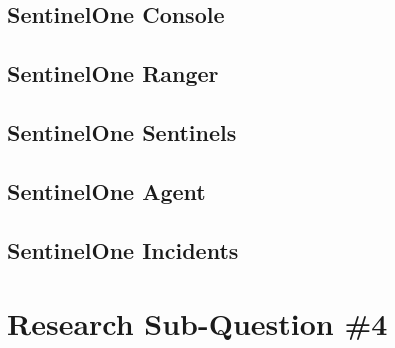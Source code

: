 \begin{multicols}{2}
      \subsection{SentinelOne Console}
      \subsection{SentinelOne Ranger}
      \subsection{SentinelOne Sentinels}
      \subsection{SentinelOne Agent}
      \subsection{SentinelOne Incidents}

      \section{Research Sub-Question \#4}
\end{multicols}